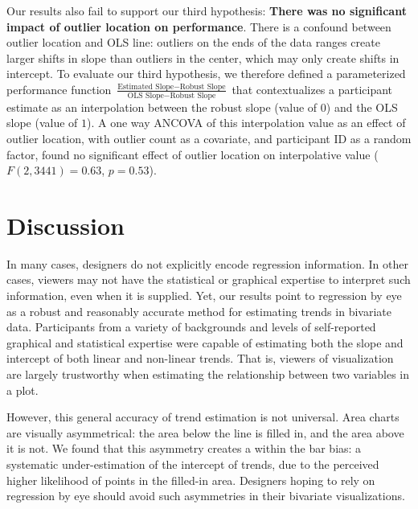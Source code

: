 \documentclass{sigchi}
\begin{document}
Our results also fail to support our third hypothesis: \textbf{There was no significant impact of outlier location on performance}. There is a confound between outlier location and OLS line: outliers on the ends of the data ranges create larger shifts in slope than outliers in the center, which may only create shifts in intercept. To evaluate our third hypothesis, we therefore defined a parameterized performance function $\frac{\text{Estimated Slope}-\text{Robust Slope}}{\text{OLS Slope} - \text{Robust Slope}}$ that contextualizes a participant estimate as an interpolation between the robust slope (value of $0$) and the OLS slope (value of $1$). A one way ANCOVA of this interpolation value as an effect of outlier location, with outlier count as a covariate, and participant ID as a random factor, found no significant effect of outlier location on interpolative value ($F(2,3441)=0.63$, $p=0.53$).


\section{Discussion}

In many cases, designers do not explicitly encode regression information. In other cases, viewers may not have the statistical or graphical expertise to interpret such information, even when it is supplied. Yet, our results point to regression by eye as a robust and reasonably accurate method for estimating trends in bivariate data. Participants from a variety of backgrounds and levels of self-reported graphical and statistical expertise were capable of estimating both the slope and intercept of both linear and non-linear trends. That is, viewers of visualization are largely trustworthy when estimating the relationship between two variables in a plot.

However, this general accuracy of trend estimation is not universal. Area charts are visually asymmetrical: the area below the line is filled in, and the area above it is not. We found that this asymmetry creates a within the bar bias: a systematic under-estimation of the intercept of trends, due to the perceived higher likelihood of points in the filled-in area. Designers hoping to rely on regression by eye should avoid such asymmetries in their bivariate visualizations.
\end{document}
